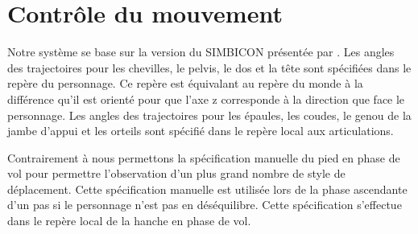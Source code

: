 \documentclass{llncs}
\begin{document}
\section{Contrôle du mouvement}
%
Notre système se base sur la version du SIMBICON présentée par \cite{coros2010generalized}. Les angles des trajectoires pour les chevilles, le pelvis, le dos et la tête sont spécifiées dans le repère du personnage. Ce repère est équivalant au repère du monde à la différence qu'il est orienté pour que l'axe z corresponde à la direction que face le personnage. Les angles des trajectoires pour les épaules, les coudes, le genou de la jambe d'appui et les orteils sont spécifié dans le repère local aux articulations.

Contrairement à \cite{coros2010generalized} nous permettons la spécification manuelle du pied en phase de vol pour permettre l'observation d'un plus grand nombre de style de déplacement. Cette spécification manuelle est utilisée lors de la phase ascendante d'un pas si le personnage n'est pas en déséquilibre. Cette spécification s'effectue dans le repère local de la hanche en phase de vol.

%
\end{document}
